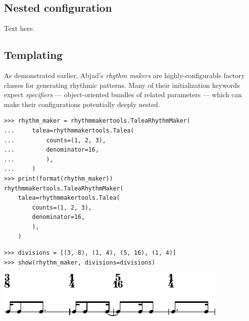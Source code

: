 \documentclass{article}
\begin{document}

\subsection{Nested configuration}

Text here.

\subsection{Templating}

As demonstrated earlier, Abjad's \emph{rhythm makers} are highly-configurable
factory classes for generating rhythmic patterns. Many of their initialization
keywords expect \emph{specifiers} --- object-oriented bundles of related
parameters --- which can make their configurations potentially deeply nested.

\begin{lstlisting}
>>> rhythm_maker = rhythmmakertools.TaleaRhythmMaker(
...     talea=rhythmmakertools.Talea(
...         counts=(1, 2, 3),
...         denominator=16,
...         ),
...     )
>>> print(format(rhythm_maker))
rhythmmakertools.TaleaRhythmMaker(
    talea=rhythmmakertools.Talea(
        counts=(1, 2, 3),
        denominator=16,
        ),
    )
\end{lstlisting}

\begin{lstlisting}
>>> divisions = [(3, 8), (1, 4), (5, 16), (1, 4)]
>>> show(rhythm_maker, divisions=divisions)
\end{lstlisting}
\includegraphics{assets/lilypond-8d11397fa8a7ed768182e6c89abe52f0.pdf}
\end{document}
